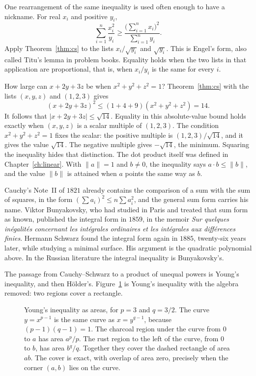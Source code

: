 One rearrangement of the same inequality is used often enough to have a nickname. For real $x_i$ and positive $y_i$,
\[
\sum_{i=1}^n\frac{x_i^2}{y_i}\ge\frac{\bigl(\sum_{i=1}^nx_i\bigr)^2}{\sum_{i=1}^ny_i}.
\]
Apply Theorem~\ref{thm:cs} to the lists $x_i/\sqrt{y_i}$ and $\sqrt{y_i}$. This is Engel's form, also called Titu's lemma in problem books. Equality holds when the two lists in that application are proportional, that is, when $x_i/y_i$ is the same for every $i$.

\begin{examplex}
How large can $x+2y+3z$ be when $x^2+y^2+z^2=1$? Theorem~\ref{thm:cs} with the lists $(x,y,z)$ and $(1,2,3)$ gives
\[
(x+2y+3z)^2\le(1+4+9)(x^2+y^2+z^2)=14.
\]
It follows that $|x+2y+3z|\le\sqrt{14}$. Equality in this absolute-value bound holds exactly when $(x,y,z)$ is a scalar multiple of $(1,2,3)$. The condition $x^2+y^2+z^2=1$ fixes the scalar: the positive multiple is $(1,2,3)/\sqrt{14}$, and it gives the value $\sqrt{14}$. The negative multiple gives $-\sqrt{14}$, the minimum. Squaring the inequality hides that distinction. The dot product itself was defined in Chapter~\ref{ch:linear}. With $\|a\|=1$ and $b\ne0$, the inequality says $a\cdot b\le\|b\|$, and the value $\|b\|$ is attained when $a$ points the same way as $b$.
\end{examplex}

Cauchy's Note~II of $1821$ already contains the comparison of a sum with the sum of squares, in the form $(\sum a_i)^2\le n\sum a_i^2$, and the general sum form carries his name. Viktor Bunyakovsky, who had studied in Paris and treated that sum form as known, published the integral form in $1859$, in the memoir \emph{Sur quelques in\'egalit\'es concernant les int\'egrales ordinaires et les int\'egrales aux diff\'erences finies}. Hermann Schwarz found the integral form again in $1885$, twenty-six years later, while studying a minimal surface. His argument is the quadratic polynomial above. In the Russian literature the integral inequality is Bunyakovsky's.

The passage from Cauchy--Schwarz to a product of unequal powers is Young's inequality, and then H\"older's. Figure~\ref{fig:young} is Young's inequality with the algebra removed: two regions cover a rectangle.

\begin{figure}[ht]
\centering
{}
\caption{Young's inequality as areas, for $p=3$ and $q=3/2$. The curve $y=x^{p-1}$ is the same curve as $x=y^{q-1}$, because $(p-1)(q-1)=1$. The charcoal region under the curve from $0$ to $a$ has area $a^p/p$. The rust region to the left of the curve, from $0$ to $b$, has area $b^q/q$. Together they cover the dashed rectangle of area $ab$. The cover is exact, with overlap of area zero, precisely when the corner $(a,b)$ lies on the curve.}
\label{fig:young}
\end{figure}


